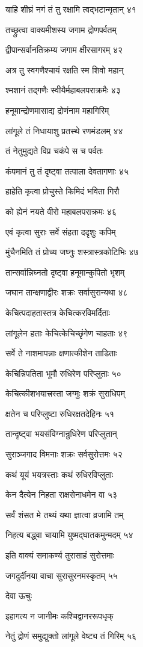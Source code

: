 याहि शीघ्रं नगं तं तु रक्षामि त्वद्भटान्मृतान् ४१

तच्छ्रुत्वा वाक्यमीशस्य जगाम द्रोणपर्वतम्

द्वीपान्सर्वानतिक्रम्य जगाम क्षीरसागरम् ४२

अत्र तु स्वगणैश्चायं रक्षति स्म शिवो महान्

श्मशानं तद्गणैः स्वीयैर्महाबलपराक्रमैः ४३

हनूमान्द्रोणमासाद्य द्रोणंनाम महागिरिम्

लांगूले तं निधायाशु प्रतस्थे रणमंडलम् ४४

तं नेतुमुद्यते विप्र चकंपे स च पर्वतः

कंपमानं तु तं दृष्ट्वा तत्पाला देवतागणाः ४५

हाहेति कृत्वा प्रोचुस्ते किमिदं भविता गिरौ

को ह्येनं नयते वीरो महाबलपराक्रमः ४६

एवं कृत्वा सुराः सर्वे संहता ददृशुः कपिम्

मुंचैनमिति तं प्रोच्य जघ्नुः शस्त्रास्त्रकोटिभिः ४७

तान्सर्वान्निघ्नतो दृष्ट्वा हनूमान्कुपितो भृशम्

जघान तान्क्षणाद्वीरः शक्रः सर्वासुरान्यथा ४८

केचित्पदाहतास्तत्र केचित्करविमर्दिताः

लांगूलेन हताः केचित्केचिच्छृंगेण चाहताः ४९

सर्वे ते नाशमापन्नाः क्षणात्कीशेन ताडिताः

केचिन्निपतिता भूमौ रुधिरेण परिप्लुताः ५०

केचित्कीशभयात्त्रस्ता जग्मुः शक्रं सुराधिपम्

क्षतेन च परिप्लुष्टा रुधिरक्षतदेहिनः ५१

तान्दृष्ट्वा भयसंविग्नान्रुधिरेण परिप्लुतान्

सुराञ्जगाद विमनाः शक्रः सर्वसुरोत्तमः ५२

कथं यूयं भयत्रस्ताः कथं रुधिरविप्लुताः

केन दैत्येन निहता राक्षसेनाधमेन वा ५३

सर्वं शंसत मे तथ्यं यथा ज्ञात्वा व्रजामि तम्

निहत्य बद्ध्वा चायामि युष्मद्घातकमुन्मदम् ५४

इति वाक्यं समाकर्ण्य तुरासाहं सुरोत्तमाः

जगदुर्दीनया वाचा सुरासुरनमस्कृतम् ५५

देवा ऊचुः

इहागत्य न जानीमः कश्चिद्वानररूपधृक्

नेतुं द्रोणं समुद्युक्तो लांगूले वेष्ट्य तं गिरिम् ५६

